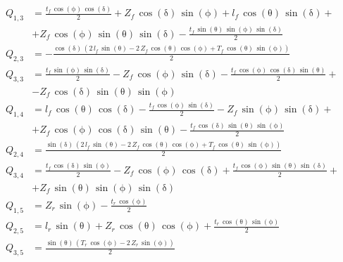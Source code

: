 \begin{align*}
Q_{1,3}&=\frac{t_{f}\,\cos\left(\mathrm{\phi}\right)\,\cos\left(\mathrm{\delta}\right)}{2}+Z_{f}\,\cos\left(\mathrm{\delta}\right)\,\sin\left(\mathrm{\phi}\right)+l_{f}\,\cos\left(\mathrm{\theta}\right)\,\sin\left(\mathrm{\delta}\right)+\\&+Z_{f}\,\cos\left(\mathrm{\phi}\right)\,\sin\left(\mathrm{\theta}\right)\,\sin\left(\mathrm{\delta}\right)-\frac{t_{f}\,\sin\left(\mathrm{\theta}\right)\,\sin\left(\mathrm{\phi}\right)\,\sin\left(\mathrm{\delta}\right)}{2}\\
Q_{2,3}&=-\frac{\cos\left(\mathrm{\delta}\right)\,\left(2\,l_{f}\,\sin\left(\mathrm{\theta}\right)-2\,Z_{f}\,\cos\left(\mathrm{\theta}\right)\,\cos\left(\mathrm{\phi}\right)+T_{f}\,\cos\left(\mathrm{\theta}\right)\,\sin\left(\mathrm{\phi}\right)\right)}{2}\\
Q_{3,3}&=\frac{t_{f}\,\sin\left(\mathrm{\phi}\right)\,\sin\left(\mathrm{\delta}\right)}{2}-Z_{f}\,\cos\left(\mathrm{\phi}\right)\,\sin\left(\mathrm{\delta}\right)-\frac{t_{f}\,\cos\left(\mathrm{\phi}\right)\,\cos\left(\mathrm{\delta}\right)\,\sin\left(\mathrm{\theta}\right)}{2}+\\&-Z_{f}\,\cos\left(\mathrm{\delta}\right)\,\sin\left(\mathrm{\theta}\right)\,\sin\left(\mathrm{\phi}\right)\\
Q_{1,4}&=l_{f}\,\cos\left(\mathrm{\theta}\right)\,\cos\left(\mathrm{\delta}\right)-\frac{t_{f}\,\cos\left(\mathrm{\phi}\right)\,\sin\left(\mathrm{\delta}\right)}{2}-Z_{f}\,\sin\left(\mathrm{\phi}\right)\,\sin\left(\mathrm{\delta}\right)+\\&+Z_{f}\,\cos\left(\mathrm{\phi}\right)\,\cos\left(\mathrm{\delta}\right)\,\sin\left(\mathrm{\theta}\right)-\frac{t_{f}\,\cos\left(\mathrm{\delta}\right)\,\sin\left(\mathrm{\theta}\right)\,\sin\left(\mathrm{\phi}\right)}{2}\\
Q_{2,4}&=\frac{\sin\left(\mathrm{\delta}\right)\,\left(2\,l_{f}\,\sin\left(\mathrm{\theta}\right)-2\,Z_{f}\,\cos\left(\mathrm{\theta}\right)\,\cos\left(\mathrm{\phi}\right)+T_{f}\,\cos\left(\mathrm{\theta}\right)\,\sin\left(\mathrm{\phi}\right)\right)}{2}\\
Q_{3,4}&=\frac{t_{f}\,\cos\left(\mathrm{\delta}\right)\,\sin\left(\mathrm{\phi}\right)}{2}-Z_{f}\,\cos\left(\mathrm{\phi}\right)\,\cos\left(\mathrm{\delta}\right)+\frac{t_{f}\,\cos\left(\mathrm{\phi}\right)\,\sin\left(\mathrm{\theta}\right)\,\sin\left(\mathrm{\delta}\right)}{2}+\\&+Z_{f}\,\sin\left(\mathrm{\theta}\right)\,\sin\left(\mathrm{\phi}\right)\,\sin\left(\mathrm{\delta}\right)\\
Q_{1,5}&=Z_{r}\,\sin\left(\mathrm{\phi}\right)-\frac{t_{r}\,\cos\left(\mathrm{\phi}\right)}{2}\\
Q_{2,5}&=l_{r}\,\sin\left(\mathrm{\theta}\right)+Z_{r}\,\cos\left(\mathrm{\theta}\right)\,\cos\left(\mathrm{\phi}\right)+\frac{t_{r}\,\cos\left(\mathrm{\theta}\right)\,\sin\left(\mathrm{\phi}\right)}{2}\\
Q_{3,5}&=\frac{\sin\left(\mathrm{\theta}\right)\,\left(T_{r}\,\cos\left(\mathrm{\phi}\right)-2\,Z_{r}\,\sin\left(\mathrm{\phi}\right)\right)}{2}\\
\end{align*}
